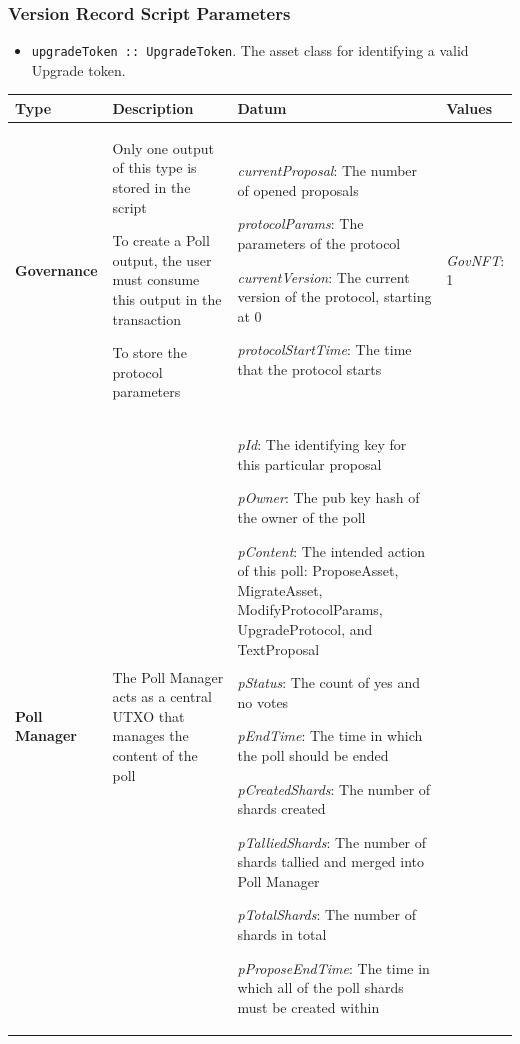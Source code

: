 \documentclass{article}
\begin{document}
\begin{sloppypar}
\hypertarget{version-record-script-parameters}{%
\subsubsection{Version Record Script
Parameters}\label{version-record-script-parameters}}

\begin{itemize}
\item
  \texttt{upgradeToken~::~UpgradeToken}. The asset class for identifying
  a valid Upgrade token.
\end{itemize}

\begin{tabularx}{\linewidth}{l|L|L|l}
\caption{Governance outputs}
\tabularnewline
\toprule
\textbf{Type} & \textbf{Description} & \textbf{Datum} &
\textbf{Values}
\tabularnewline
\midrule
\endhead
\textbf{Governance}
&
Only one output of this type is stored in the script

To create a Poll output, the user must consume this output in the
transaction

To store the protocol parameters
&
\emph{currentProposal}: The number of opened proposals

\emph{protocolParams}: The parameters of the protocol

\emph{currentVersion}: The current version of the protocol, starting at
0

\emph{protocolStartTime}: The time that the protocol starts
&
\emph{GovNFT}: 1
\tabularnewline
\midrule
\textbf{Poll Manager}
&
The Poll Manager acts as a central UTXO that manages the content of the
poll
&
\emph{pId}: The identifying key for this particular proposal

\emph{pOwner}: The pub key hash of the owner of the poll

\emph{pContent}: The intended action of this poll: ProposeAsset,
MigrateAsset, ModifyProtocolParams, UpgradeProtocol, and TextProposal

\emph{pStatus}: The count of yes and no votes

\emph{pEndTime}: The time in which the poll should be ended

\emph{pCreatedShards}: The number of shards created

\emph{pTalliedShards}: The number of shards tallied and merged into Poll
Manager

\emph{pTotalShards}: The number of shards in total

\emph{pProposeEndTime}: The time in which all of the poll shards must be
created within


\end{tabularx}
\end{sloppypar}
\end{document}
